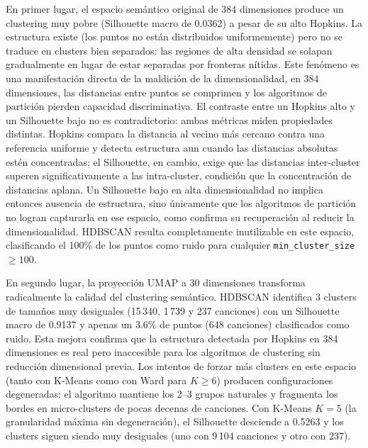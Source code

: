 En primer lugar, el espacio semántico original de 384 dimensiones produce un clustering muy pobre (Silhouette macro de 0.0362) a pesar de su alto Hopkins. La estructura existe (los puntos no están distribuidos uniformemente) pero no se traduce en clusters bien separados: las regiones de alta densidad se solapan gradualmente en lugar de estar separadas por fronteras nítidas. Este fenómeno es una manifestación directa de la maldición de la dimensionalidad, en 384 dimensiones, las distancias entre puntos se comprimen y los algoritmos de partición pierden capacidad discriminativa. El contraste entre un Hopkins alto y un Silhouette bajo no es contradictorio: ambas métricas miden propiedades distintas. Hopkins compara la distancia al vecino más cercano contra una referencia uniforme y detecta estructura aun cuando las distancias absolutas estén concentradas; el Silhouette, en cambio, exige que las distancias inter-cluster superen significativamente a las intra-cluster, condición que la concentración de distancias aplana. Un Silhouette bajo en alta dimensionalidad no implica entonces ausencia de estructura, sino únicamente que los algoritmos de partición no logran capturarla en ese espacio, como confirma su recuperación al reducir la dimensionalidad. HDBSCAN resulta completamente inutilizable en este espacio, clasificando el 100\% de los puntos como ruido para cualquier \texttt{min\_cluster\_size} $\geq 100$.

En segundo lugar, la proyección UMAP a 30 dimensiones transforma radicalmente la calidad del clustering semántico. HDBSCAN identifica 3 clusters de tamaños muy desiguales (15\,340, 1\,739 y 237 canciones) con un Silhouette macro de 0.9137 y apenas un 3.6\% de puntos (648 canciones) clasificados como ruido. Esta mejora confirma que la estructura detectada por Hopkins en 384 dimensiones es real pero inaccesible para los algoritmos de clustering sin reducción dimensional previa. Los intentos de forzar más clusters en este espacio (tanto con K-Means como con Ward para $K \geq 6$) producen configuraciones degeneradas: el algoritmo mantiene los 2--3 grupos naturales y fragmenta los bordes en micro-clusters de pocas decenas de canciones. Con K-Means $K = 5$ (la granularidad máxima sin degeneración), el Silhouette desciende a 0.5263 y los clusters siguen siendo muy desiguales (uno con 9\,104 canciones y otro con 237).

